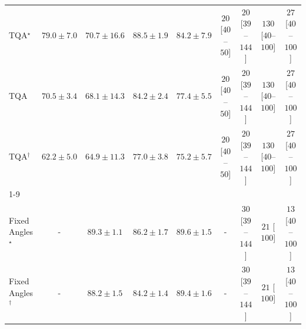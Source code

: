 \begin{tabular}{l|cccc|cccc|}
TQA$^\star$ & {\cellcolor[HTML]{E2650F}} \color[HTML]{F1F1F1} $79.0\pm 7.0$ & {\cellcolor[HTML]{FEA634}} \color[HTML]{000000} $70.7\pm 16.6$ & {\cellcolor[HTML]{943304}} \color[HTML]{F1F1F1} $88.5\pm 1.9$ & {\cellcolor[HTML]{BE4503}} \color[HTML]{F1F1F1} $84.2\pm 7.9$ & {\cellcolor[HTML]{FFF4F0}} \color[HTML]{000000} $20$ [$40$--$50$] & {\cellcolor[HTML]{FFF4F0}} \color[HTML]{000000} $20$ [$39$--$144$] & {\cellcolor[HTML]{FDDBD7}} \color[HTML]{000000} $130$ [$40$--$100$] & {\cellcolor[HTML]{FFF3EF}} \color[HTML]{000000} $27$ [$40$--$100$] \\
TQA & {\cellcolor[HTML]{FEA736}} \color[HTML]{000000} $70.5\pm 3.4$ & {\cellcolor[HTML]{FEBA46}} \color[HTML]{000000} $68.1\pm 14.3$ & {\cellcolor[HTML]{BE4503}} \color[HTML]{F1F1F1} $84.2\pm 2.4$ & {\cellcolor[HTML]{EC7014}} \color[HTML]{F1F1F1} $77.4\pm 5.5$ & {\cellcolor[HTML]{FFF4F0}} \color[HTML]{000000} $20$ [$40$--$50$] & {\cellcolor[HTML]{FFF4F0}} \color[HTML]{000000} $20$ [$39$--$144$] & {\cellcolor[HTML]{FDDBD7}} \color[HTML]{000000} $130$ [$40$--$100$] & {\cellcolor[HTML]{FFF3EF}} \color[HTML]{000000} $27$ [$40$--$100$] \\
TQA$^\dagger$ & {\cellcolor[HTML]{FEE08A}} \color[HTML]{000000} $62.2\pm 5.0$ & {\cellcolor[HTML]{FED069}} \color[HTML]{000000} $64.9\pm 11.3$ & {\cellcolor[HTML]{EE7416}} \color[HTML]{F1F1F1} $77.0\pm 3.8$ & {\cellcolor[HTML]{F4811D}} \color[HTML]{F1F1F1} $75.2\pm 5.7$ & {\cellcolor[HTML]{FFF4F0}} \color[HTML]{000000} $20$ [$40$--$50$] & {\cellcolor[HTML]{FFF4F0}} \color[HTML]{000000} $20$ [$39$--$144$] & {\cellcolor[HTML]{FDDBD7}} \color[HTML]{000000} $130$ [$40$--$100$] & {\cellcolor[HTML]{FFF3EF}} \color[HTML]{000000} $27$ [$40$--$100$] \\
\cline{1-9}
\multicolumn{9}{c}{\rule{0pt}{8pt}PP} \\
\midrule
Fixed Angles$^\star$ & {\cellcolor[HTML]{000000}} \color[HTML]{F1F1F1} {\cellcolor{white}} \color{black} - & {\cellcolor[HTML]{005F34}} \color[HTML]{F1F1F1} $89.3\pm 1.1$ & {\cellcolor[HTML]{0C723B}} \color[HTML]{F1F1F1} $86.2\pm 1.7$ & {\cellcolor[HTML]{005D33}} \color[HTML]{F1F1F1} $89.6\pm 1.5$ & {\cellcolor[HTML]{000000}} \color[HTML]{F1F1F1} {\cellcolor{white}} \color{black} - & {\cellcolor[HTML]{FFF2EE}} \color[HTML]{000000} $30$ [$39$--$144$] & {\cellcolor[HTML]{FFF4F0}} \color[HTML]{000000} $21$ [$100$] & {\cellcolor[HTML]{FFF6F2}} \color[HTML]{000000} $13$ [$40$--$100$] \\
Fixed Angles$^\dagger$ & {\cellcolor[HTML]{000000}} \color[HTML]{F1F1F1} {\cellcolor{white}} \color{black} - & {\cellcolor[HTML]{006737}} \color[HTML]{F1F1F1} $88.2\pm 1.5$ & {\cellcolor[HTML]{197C40}} \color[HTML]{F1F1F1} $84.2\pm 1.4$ & {\cellcolor[HTML]{005F34}} \color[HTML]{F1F1F1} $89.4\pm 1.6$ & {\cellcolor[HTML]{000000}} \color[HTML]{F1F1F1} {\cellcolor{white}} \color{black} - & {\cellcolor[HTML]{FFF2EE}} \color[HTML]{000000} $30$ [$39$--$144$] & {\cellcolor[HTML]{FFF4F0}} \color[HTML]{000000} $21$ [$100$] & {\cellcolor[HTML]{FFF6F2}} \color[HTML]{000000} $13$ [$40$--$100$] \\

\end{tabular}
